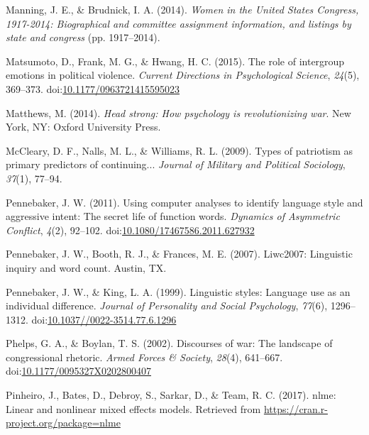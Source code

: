 \documentclass[english,,man,floatsintext]{apa6}
\begin{document}
\leavevmode\hypertarget{ref-Manning2014}{}%
Manning, J. E., \& Brudnick, I. A. (2014). \emph{Women in the United States Congress, 1917-2014: Biographical and committee assignment information, and listings by state and congress} (pp. 1917--2014).

\leavevmode\hypertarget{ref-Matsumoto2015}{}%
Matsumoto, D., Frank, M. G., \& Hwang, H. C. (2015). The role of intergroup emotions in political violence. \emph{Current Directions in Psychological Science}, \emph{24}(5), 369--373. doi:\href{https://doi.org/10.1177/0963721415595023}{10.1177/0963721415595023}

\leavevmode\hypertarget{ref-Matthews2014}{}%
Matthews, M. (2014). \emph{Head strong: How psychology is revolutionizing war}. New York, NY: Oxford University Press.

\leavevmode\hypertarget{ref-McCleary2009}{}%
McCleary, D. F., Nalls, M. L., \& Williams, R. L. (2009). Types of patriotism as primary predictors of continuing... \emph{Journal of Military and Political Sociology}, \emph{37}(1), 77--94.

\leavevmode\hypertarget{ref-Pennebaker2011}{}%
Pennebaker, J. W. (2011). Using computer analyses to identify language style and aggressive intent: The secret life of function words. \emph{Dynamics of Asymmetric Conflict}, \emph{4}(2), 92--102. doi:\href{https://doi.org/10.1080/17467586.2011.627932}{10.1080/17467586.2011.627932}

\leavevmode\hypertarget{ref-Pennebaker2007}{}%
Pennebaker, J. W., Booth, R. J., \& Frances, M. E. (2007). Liwc2007: Linguistic inquiry and word count. Austin, TX.

\leavevmode\hypertarget{ref-Pennebaker1999}{}%
Pennebaker, J. W., \& King, L. A. (1999). Linguistic styles: Language use as an individual difference. \emph{Journal of Personality and Social Psychology}, \emph{77}(6), 1296--1312. doi:\href{https://doi.org/10.1037//0022-3514.77.6.1296}{10.1037//0022-3514.77.6.1296}

\leavevmode\hypertarget{ref-Phelps2002}{}%
Phelps, G. A., \& Boylan, T. S. (2002). Discourses of war: The landscape of congressional rhetoric. \emph{Armed Forces \& Society}, \emph{28}(4), 641--667. doi:\href{https://doi.org/10.1177/0095327X0202800407}{10.1177/0095327X0202800407}

\leavevmode\hypertarget{ref-Pinheiro2017}{}%
Pinheiro, J., Bates, D., Debroy, S., Sarkar, D., \& Team, R. C. (2017). nlme: Linear and nonlinear mixed effects models. Retrieved from \url{https://cran.r-project.org/package=nlme}
\end{document}
